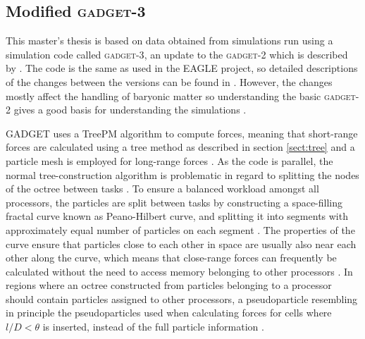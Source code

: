 \documentclass[english, twoside]{HYgradu}
\begin{document}




\subsection{Modified \textsc{gadget-3}} \label{sect:gadget}
This master's thesis is based on data obtained from simulations run using a simulation code called \textsc{gadget-3}, an update to the \textsc{gadget-2} which is described by \citet{springel2005cosmological}. The code is the same as used in the EAGLE project, so detailed descriptions of the changes between the versions can be found in \citet{schaye2015eagle}. However, the changes mostly affect the handling of baryonic matter so understanding the basic \textsc{gadget-2} gives a good basis for understanding the simulations \citep{schaye2015eagle}.

GADGET uses a TreePM algorithm to compute forces, meaning that short-range forces are calculated using a tree method as described in section \ref{sect:tree} and a particle mesh is employed for long-range forces \citep{springel2005cosmological}. As the code is parallel, the normal tree-construction algorithm is problematic in regard to splitting the nodes of the octree between tasks \citep{springel2005cosmological}. To ensure a balanced workload amongst all processors, the particles are split between tasks by constructing a space-filling fractal curve known as Peano-Hilbert curve, and splitting it into segments with approximately equal number of particles on each segment \citep{springel2005cosmological}. The properties of the curve ensure that particles close to each other in space are usually also near each other along the curve, which means that close-range forces can frequently be calculated without the need to access memory belonging to other processors \citep{springel2005cosmological}. In regions where an octree constructed from particles belonging to a processor should contain particles assigned to other processors, a pseudoparticle resembling in principle the pseudoparticles used when calculating forces for cells where $l/D < \theta$ is inserted, instead of the full particle information \citep{springel2005cosmological}.
\end{document}
